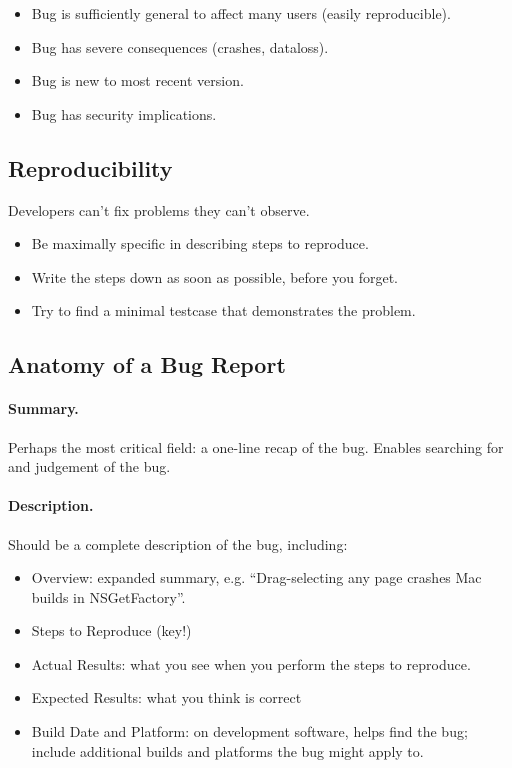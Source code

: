 \documentclass[11pt]{article}
\begin{document}
\begin{itemize}[noitemsep]
\item Bug is sufficiently general to affect many users (easily reproducible).
\item Bug has severe consequences (crashes, dataloss).
\item Bug is new to most recent version.
\item Bug has security implications.
\end{itemize}

\subsection*{Reproducibility}

Developers can't fix problems they can't observe. 
\begin{itemize}[noitemsep]
\item Be maximally
specific in describing steps to reproduce.
\item Write the steps down as
soon as possible, before you forget. 
\item Try to find a minimal
testcase that demonstrates the problem.
\end{itemize}

\subsection*{Anatomy of a Bug Report}

\paragraph{Summary.} Perhaps the most critical field: a one-line recap of the bug. Enables searching for and judgement of the bug.

\paragraph{Description.} Should be a complete description of the bug, 
including:

\begin{itemize}[noitemsep]
\item Overview: expanded summary, e.g. ``Drag-selecting any page crashes 
Mac builds in NSGetFactory''.
\item Steps to Reproduce (key!)
\item Actual Results: what you see when you perform the steps to reproduce.
\item Expected Results: what you think is correct
\item Build Date and Platform: on development software, helps find the bug;
include additional builds and platforms the bug might apply to.
\end{itemize}
\end{document}
